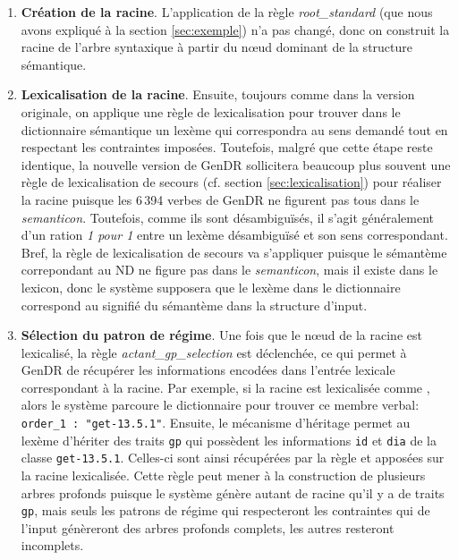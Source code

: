 \begin{enumerate}
  \item \textbf{Création de la racine}.
  L'application de la règle \emph{root\_standard} (que nous avons expliqué à la section \ref{sec:exemple}) n'a pas changé, donc on construit la racine de l'arbre syntaxique à partir du n\oe{}ud dominant de la structure sémantique.

  \item \textbf{Lexicalisation de la racine}.
  Ensuite, toujours comme dans la version originale, on applique une règle de lexicalisation pour trouver dans le dictionnaire sémantique un lexème qui correspondra au sens demandé tout en respectant les contraintes imposées. Toutefois, malgré que cette étape reste identique, la nouvelle version de GenDR sollicitera beaucoup plus souvent une règle de lexicalisation de secours (cf. section \ref{sec:lexicalisation}) pour réaliser la racine puisque les 6\,394 verbes de GenDR ne figurent pas tous dans le \emph{semanticon}. Toutefois, comme ils sont désambiguïsés, il s'agit généralement d'un ration \emph{1 pour 1} entre un lexème désambiguïsé et son sens correspondant. Bref, la règle de lexicalisation de secours va s'appliquer puisque le sémantème correpondant au \ac{ND} ne figure pas dans le \emph{semanticon}, mais il existe dans le lexicon, donc le système supposera que le lexème dans le dictionnaire correspond au signifié du sémantème dans la structure d'input.

  \item \textbf{Sélection du patron de régime}.
  Une fois que le n\oe{}ud de la racine est lexicalisé, la règle \emph{actant\_gp\_selection} est déclenchée, ce qui permet à GenDR de récupérer les informations encodées dans l'entrée lexicale correspondant à la racine. Par exemple, si la racine est lexicalisée comme , alors le système parcoure le dictionnaire pour trouver ce membre verbal: \lstinline|order_1 : "get-13.5.1"|. Ensuite, le mécanisme d'héritage permet au lexème  d'hériter des traits \texttt{gp} qui possèdent les informations \texttt{id} et \texttt{dia} de la classe \texttt{get-13.5.1}. Celles-ci sont ainsi récupérées par la règle et apposées sur la racine lexicalisée. Cette règle peut mener à la construction de plusieurs arbres profonds puisque le système génère autant de racine qu'il y a de traits \texttt{gp}, mais seuls les patrons de régime qui respecteront les contraintes qui de l'input génèreront des arbres profonds complets, les autres resteront incomplets.
	

\end{enumerate}
